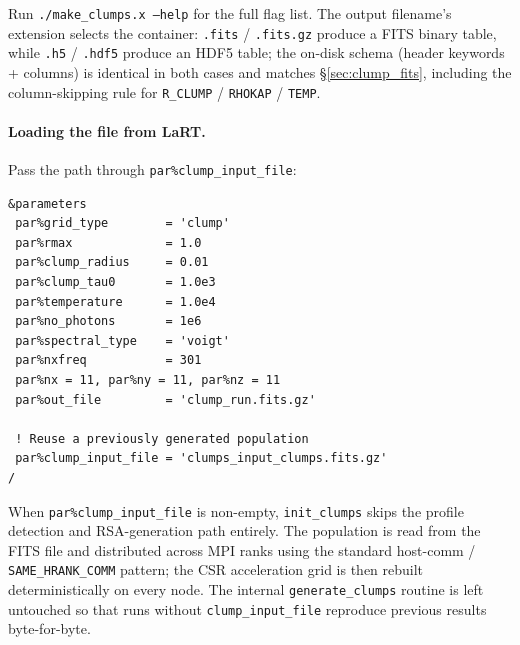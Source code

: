 \documentclass[english,a4paper]{my_memo}
\begin{document}
Run \texttt{./make\_clumps.x --help} for the full flag list.  The output
filename's extension selects the container: \texttt{.fits} /
\texttt{.fits.gz} produce a FITS binary table, while \texttt{.h5} /
\texttt{.hdf5} produce an HDF5 table; the on-disk schema (header
keywords + columns) is identical in both cases and matches
\S\ref{sec:clump_fits}, including the column-skipping rule for
\texttt{R\_CLUMP} / \texttt{RHOKAP} / \texttt{TEMP}.

\paragraph{Loading the file from LaRT.}
Pass the path through \texttt{par\%clump\_input\_file}:
\begin{lstlisting}
&parameters
 par%grid_type        = 'clump'
 par%rmax             = 1.0
 par%clump_radius     = 0.01
 par%clump_tau0       = 1.0e3
 par%temperature      = 1.0e4
 par%no_photons       = 1e6
 par%spectral_type    = 'voigt'
 par%nxfreq           = 301
 par%nx = 11, par%ny = 11, par%nz = 11
 par%out_file         = 'clump_run.fits.gz'

 ! Reuse a previously generated population
 par%clump_input_file = 'clumps_input_clumps.fits.gz'
/
\end{lstlisting}
When \texttt{par\%clump\_input\_file} is non-empty,
\texttt{init\_clumps} skips the profile detection and RSA-generation
path entirely.  The population is read from the FITS file and
distributed across MPI ranks using the standard host-comm /
\texttt{SAME\_HRANK\_COMM} pattern; the CSR acceleration grid is then
rebuilt deterministically on every node.  The internal
\texttt{generate\_clumps} routine is left untouched so that runs
without \texttt{clump\_input\_file} reproduce previous results
byte-for-byte.
\end{document}
